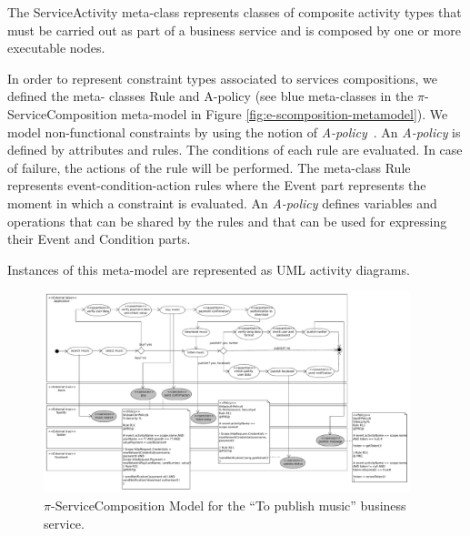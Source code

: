 \begin{itemizedTrivlist}
\item The {\sc ServiceActivity} meta-class represents classes of composite activity types that must be carried out as part of a business service and is composed by one or more execu\-ta\-ble nodes.

\item In order to represent constraint types associated to services compositions, we defined the me\-ta- classes {\sc Rule} and {\sc A-policy} (see blue meta-classes in the $\pi$-Serv\-ice\-Com\-po\-si\-tion meta-model in Figure \ref{fig:e-scomposition-metamodel}).
We model non-func\-tion\-al constraints by using the notion of {\em A-policy}~\cite{Espinosa-Oviedo2011a,CIC:eovszmc09c}.
An {\em A-policy} is defined by attributes and rules. 
The conditions of each rule are evaluated.
In case of failure, the actions of the rule will be performed.
The meta-class {\sc Rule} represents event-condition-action rules where the {\sc Event} part represents the moment in which a constraint  is evaluated.
An {\em A-policy} defines variables and operations that can be shared by the rules and that can be used for expressing their Event and Condition parts. 
\end{itemizedTrivlist}
Instances of this meta-model are represented as UML activity diagrams. 
\begin{figure}
\centering
\includegraphics[width=0.95\textwidth]{figs/piServiceComposition-toPublishMusic}
\caption{$\pi$-ServiceComposition Model for the ``To publish
music'' business service.}
\label{fig:servicecompositionmodel}
\end{figure}

